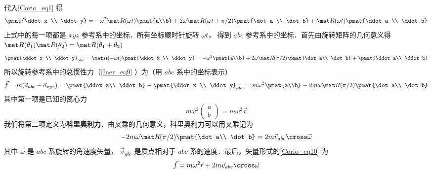  代入\autoref{Corio_eq1} 得
\begin{equation}
\pmat{\ddot x \\ \ddot y} =
- {\omega ^2}\mat R(\omega t)\pmat{a\\b} + 2\omega \mat R(\omega t + \pi /2)\pmat{\dot a \\ \dot b} + \mat R(\omega t)\pmat{\ddot a \\ \ddot b}
\end{equation}
上式中的每一项都是 $xyz$ 参考系中的坐标．所有坐标顺时针旋转 $\omega t$， 得到 $abc$ 参考系中的坐标．首先由旋转矩阵的几何意义得 $\mat R(\theta_1)\mat R(\theta_2) = \mat R(\theta_1 + \theta_2)$
\begin{equation}
\pmat{\ddot x \\ \ddot y}_{abc} =
\mat R(-\omega t ) \pmat{\ddot x \\ \ddot y} =
- {\omega^2} \pmat{a\\b} + 2\omega \mat R(\pi /2)\pmat{\dot a\\ \dot b} + \pmat{\ddot a\\ \ddot b}
\end{equation}
所以旋转参考系中的总惯性力（\autoref{Iner_eq9} ）为（用 $abc$ 系中的坐标表示）
\begin{equation}\label{Corio_eq10}
\vec f = m({\vec a}_{abc} - {\vec a}_{xyz})
= \pmat{\ddot a\\ \ddot b} - \pmat{\ddot x \\ \ddot y}_{abc} = m{\omega ^2}\pmat{a\\b} - 2m\omega \mat R(\pi /2)\pmat{\dot a\\ \dot b}
\end{equation}
其中第一项是已知的离心力
\begin{equation}
m{\omega ^2} \begin{pmatrix} a\\b \end{pmatrix} = m{\omega ^2}\vec r
\end{equation}
我们将第二项定义为\textbf{科里奥利力}．由叉乘的几何意义，科里奥利力可以用叉乘记为
\begin{equation}
- 2m\omega \mat R(\pi /2)\pmat{\dot a\\ \dot b} = 2m{\vec v_{abc}} \cross \vec \omega
\end{equation}
其中 $\vec\omega$ 是 $abc$ 系旋转的角速度矢量， $\vec v_{abc}$ 是质点相对于 $abc$ 系的速度．最后，矢量形式的\autoref{Corio_eq10} 为
\begin{equation}
\vec f = m{\omega ^2}\vec r + 2m{\vec v_{abc}} \cross \vec \omega 
\end{equation}
 




